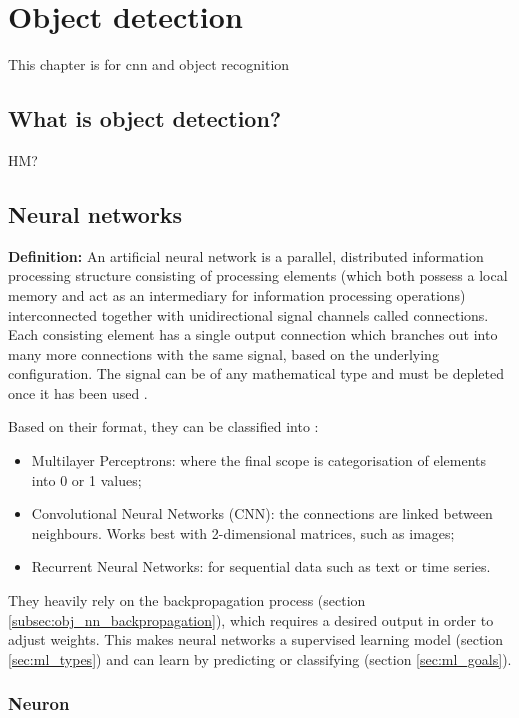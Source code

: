 \chapter{Object detection}
\label{chap:obj}

This chapter is for cnn and object recognition

\section{What is object detection?}
\label{sec:obj_what}

HM?

\section{Neural networks}
\label{sec:obj_nn}

\textbf{Definition:} An artificial neural network is a parallel, distributed information processing structure consisting of processing elements (which both possess a local memory and act as an intermediary for information processing operations) interconnected together with unidirectional signal channels called connections. Each consisting element has a single output connection which branches out into many more connections with the same signal, based on the underlying configuration. The signal can be of any mathematical type and must be depleted once it has been used \cite{backpropagation}.

Based on their format, they can be classified into \cite{toulouse-nn}:

\begin{itemize}
\item{Multilayer Perceptrons: where the final scope is categorisation of elements into 0 or 1 values;}
\item{Convolutional Neural Networks (CNN): the connections are linked between neighbours. Works best with 2-dimensional matrices, such as images;}
\item{Recurrent Neural Networks: for sequential data such as text or time series.}
\end{itemize}

They heavily rely on the backpropagation process (section \ref{subsec:obj_nn_backpropagation}), which requires a desired output in order to adjust weights. This makes neural networks a supervised learning model (section \ref{sec:ml_types}) and can learn by predicting or classifying (section \ref{sec:ml_goals}).

\subsection{Neuron}
\label{subsec:obj_nn_neuron}

